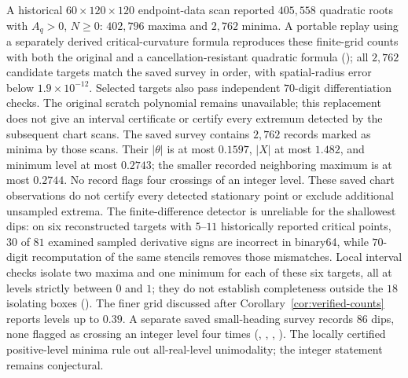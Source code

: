 \documentclass[11pt]{article}
\theoremstyle{remark}
\begin{document}
A historical $60\times120\times120$ endpoint-data scan reported
$405{,}558$ quadratic roots with $A_q>0$, $N\ge0$: $402{,}796$ maxima
and $2{,}762$ minima.  A portable replay using a separately derived
critical-curvature formula reproduces these finite-grid counts with
both the original and a cancellation-resistant quadratic formula
(); all $2{,}762$ candidate targets
match the saved survey in order, with spatial-radius error below
$1.9\times10^{-12}$.  Selected targets also pass independent
$70$-digit differentiation checks.  The original scratch polynomial
remains unavailable; this replacement does not give an interval
certificate or certify every extremum detected by the subsequent
chart scans.  The saved survey contains $2{,}762$ records marked as
minima by those scans.  Their $|\theta|$ is at most
$0.1597$, $|X|$ at most $1.482$, and minimum level at most $0.2743$;
the smaller recorded neighboring maximum is at most $0.2744$.
No record flags four crossings of an integer level.  These saved chart observations do not certify every detected
stationary point or exclude additional unsampled extrema.  The
finite-difference detector is unreliable for the shallowest dips:
on six reconstructed targets with $5$--$11$ historically reported
critical points, $30$ of $81$ examined sampled derivative signs are
incorrect in binary64, while $70$-digit recomputation of the same
stencils removes those mismatches.  Local interval checks isolate
two maxima and one minimum for each of these six targets, all at
levels strictly between $0$ and $1$; they do not establish completeness
outside the $18$ isolating boxes
().  The finer grid discussed after
Corollary~\ref{cor:verified-counts} reports levels up to $0.39$.
A separate saved small-heading survey records $86$ dips, none flagged
as crossing an integer level four times
(,
, ,
).  The locally certified positive-level minima
rule out all-real-level unimodality; the integer
statement remains conjectural.
\end{document}
